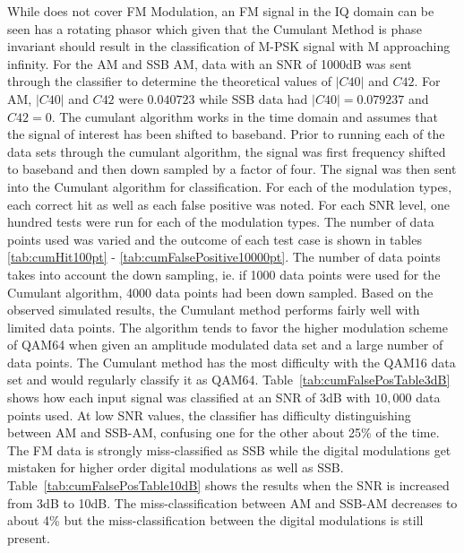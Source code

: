 While \cite{swami2000} does not cover FM Modulation, an FM signal in the IQ
domain can be seen has a rotating phasor which given that the Cumulant Method is
phase invariant should result in the classification of M-PSK signal with M
approaching infinity.  
For the AM and SSB AM, data with an SNR of 1000dB was sent through the
classifier to determine the theoretical values of $|C40|$ and $C42$.  For AM,
$|C40|$ and $C42$ were $0.040723$ while SSB data had $|C40| = 0.079237$ and
$C42 = 0$.
The cumulant algorithm works in the time domain and assumes that the signal of
interest has been shifted to baseband.  Prior to running each of the data sets
through the cumulant algorithm, the signal was first frequency shifted to
baseband and then down sampled by a factor of four.  The signal was then sent
into the Cumulant algorithm for classification.  For each of the modulation
types, each correct hit as well as each false positive was noted.  For each
SNR level, one hundred tests were run for each of the modulation types.  
The number of data points used was varied and the outcome of each test case is
shown in tables \ref{tab:cumHit100pt} - \ref{tab:cumFalsePositive10000pt}.  The
number of data points takes into account the down sampling, ie. if 1000 data
points were used for the Cumulant algorithm, 4000 data points had been down
sampled.
Based on the observed simulated results, the Cumulant method performs fairly
well with limited data points.  The algorithm tends to favor the higher modulation
scheme of QAM64 when given an amplitude modulated data set and a large number of
data points.  The Cumulant method has the most difficulty with the QAM16 data set
and would regularly classify it as QAM64.
Table~\ref{tab:cumFalsePosTable3dB} shows how each input signal was classified
at an SNR of 3dB with $10,000$ data points used.  At low SNR values, the
classifier has difficulty distinguishing between AM and SSB-AM, confusing one
for the other about 25\% of the time.
The FM data is strongly miss-classified as SSB while the digital modulations get
mistaken for higher order digital modulations as well as SSB. 
Table~\ref{tab:cumFalsePosTable10dB} shows the results when the SNR is increased
from 3dB to 10dB.  The miss-classification between AM and SSB-AM decreases to
about 4\% but the miss-classification between the digital modulations is still
present.  

